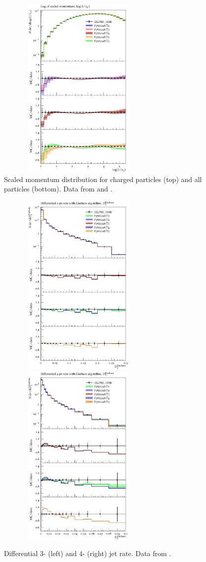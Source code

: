 \documentclass[aps,preprint,floatfix,nofootinbib,showpacs]{revtex4-1}
\begin{document}
\begin{figure}[btp]
 \hfill
  \includegraphics[width=8cm, height=9cm]{DELPHI_1996/d08-x01-y01.pdf}
  \caption{Scaled momentum distribution for charged particles (top) and all particles (bottom). Data
  from \cite{Barate:1996fi} and \cite{Abreu:1996na}.}
  \label{Fig-3}
 \end{figure}
 
 
 
  \begin{figure}[!h]
  \centering
   \includegraphics[width=8cm, height=9cm]{DELPHI_1996/d27-x01-y01.pdf}
 \hfill
  \includegraphics[width=8cm, height=9cm]{DELPHI_1996/d29-x01-y01.pdf}
  \caption{Differential $3$- (left) and $4$- (right) jet rate. Data from \cite{Abreu:1996na}. }
  \label{Fig-4}
 \end{figure}
\end{document}
